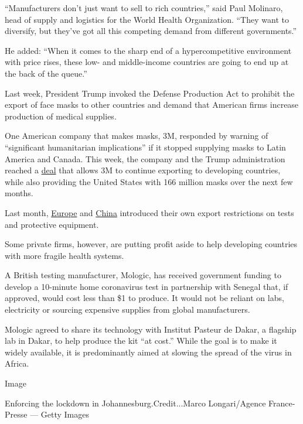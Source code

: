 ``Manufacturers don't just want to sell to rich countries,'' said Paul
Molinaro, head of supply and logistics for the World Health
Organization. ``They want to diversify, but they've got all this
competing demand from different governments.''

He added: ``When it comes to the sharp end of a hypercompetitive
environment with price rises, these low- and middle-income countries are
going to end up at the back of the queue.''

Last week, President Trump invoked the Defense Production Act to
prohibit the export of face masks to other countries and demand that
American firms increase production of medical supplies.

One American company that makes masks, 3M, responded by warning of
``significant humanitarian implications'' if it stopped supplying masks
to Latin America and Canada. This week, the company and the Trump
administration reached a
\href{https://news.3m.com/blog/3m-stories/3m-and-trump-administration-announce-plan-import-1665-million-additional-respirators}{deal}
that allows 3M to continue exporting to developing countries, while also
providing the United States with 166 million masks over the next few
months.

Last month,
\href{https://ec.europa.eu/commission/presscorner/detail/en/IP_20_469}{Europe}
and
\href{https://uk.reuters.com/article/us-health-coronavirus-china-testkits/china-clamps-down-on-coronavirus-test-kit-exports-after-accuracy-questioned-idUKKBN21J51S}{China}
introduced their own export restrictions on tests and protective
equipment.

Some private firms, however, are putting profit aside to help developing
countries with more fragile health systems.

A British testing manufacturer, Mologic, has received government funding
to develop a 10-minute home coronavirus test in partnership with Senegal
that, if approved, would cost less than \$1 to produce. It would not be
reliant on labs, electricity or sourcing expensive supplies from global
manufacturers.

Mologic agreed to share its technology with Institut Pasteur de Dakar, a
flagship lab in Dakar, to help produce the kit ``at cost.'' While the
goal is to make it widely available, it is predominantly aimed at
slowing the spread of the virus in Africa.

Image

Enforcing the lockdown in Johannesburg.Credit...Marco Longari/Agence
France-Presse --- Getty Images

